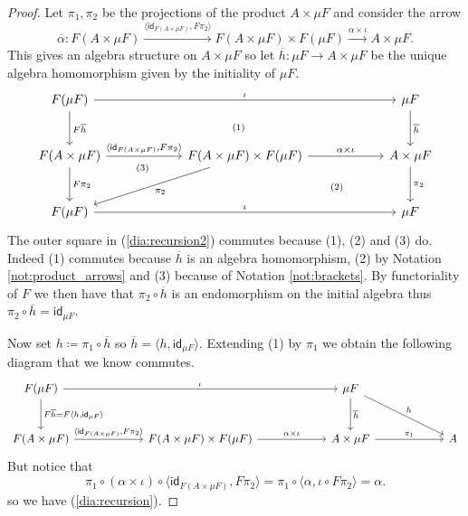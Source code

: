 \documentclass[letterpaper, 11pt, oneside]{memoir}
\theoremstyle{myteo}
\numberwithin{equation}{section}
\newcommand{\id}{\textsf{id}}
\newcommand{\intoprod}[2]{{\langle #1, #2\rangle}}
\begin{document}
\begin{proof}
  Let \(\pi_1, \pi_2\) be the projections of the product \(A \times \mu F\) and consider the arrow
  \begin{equation*}
    \overline{\alpha} \colon F(A \times \mu F) \xrightarrow{\intoprod{\id_{F(A \times \mu F)}}{F\pi_2}} F(A \times \mu F) \times F(\mu F) \xrightarrow{\alpha \times \iota} A \times \mu F.
  \end{equation*}
  This gives an algebra structure on \(A \times \mu F\) so let \(\overline{h} \colon \mu F \to A \times \mu F\) be the unique algebra homomorphism given by the initiality of \(\mu F\).
  \begin{equation}
    \label{dia:recursion2}
    \begin{tikzcd}[row sep = large, column sep = 6 em]
      F(\mu F) \ar[drr, phantom, "\scriptstyle (1)"] \ar[d, "F\overline{h}"] \ar[rr, "\iota"] & & \mu F \ar[d, "\overline{h}"] \\
      F(A \times \mu F) \ar[r, "\intoprod{\id_{F(A \times \mu F)}}{F\pi_2}"] \ar[drr, phantom, "\scriptstyle (3)", very near start] \ar[d, "F\pi_2"] & F(A \times \mu F) \times F(\mu F) \ar[r, "\alpha \times \iota"] \ar[dl, "\pi_2"] \ar[dr, phantom, "\scriptstyle (2)"] & A \times \mu F \ar[d, "\pi_2"] \\
      F(\mu F) \ar[rr, "\iota"] & & \mu F
    \end{tikzcd}
  \end{equation}
  The outer square in (\ref{dia:recursion2}) commutes because (1), (2) and (3) do.
  Indeed (1) commutes because \(\overline{h}\) is an algebra homomorphism, (2) by Notation \ref{not:product_arrows} and (3) because of Notation \ref{not:brackets}.
  By functoriality of \(F\) we then have that \(\pi_2 \circ \overline{h}\) is an endomorphism on the initial algebra thus \(\pi_2 \circ \overline{h} = \id_{\mu F}\).

  Now set \(h \coloneqq \pi_1 \circ \overline{h}\) so \(\overline{h} = \intoprod{h}{\id_{\mu F}}\).
  Extending (1) by \(\pi_1\) we obtain the following diagram that we know commutes.
  \begin{equation*}
    \begin{tikzcd}[row sep = large, column sep = 6 em]
      F(\mu F) \ar[rr, "\iota"] \ar[d, "F\overline{h} = F\intoprod{h}{\id_{\mu F}}"]& & \mu F \ar[d, "\overline{h}"] \ar[dr, "h"] & \\
      F(A \times \mu F) \ar[r, "\intoprod{\id_{F(A \times \mu F)}}{F\pi_2}"] & F(A \times \mu F) \ar[r, "\alpha \times \iota"] \times F(\mu F) & A \times \mu F \ar[r, "\pi_1"] & A
    \end{tikzcd}
  \end{equation*}
  But notice that
  \begin{equation*}
    \pi_1 \circ (\alpha \times \iota) \circ \intoprod{\id_{F(A \times \mu F)}}{F\pi_2} = \pi_1 \circ \intoprod{\alpha}{\iota \circ F\pi_2} = \alpha.
  \end{equation*}
  so we have (\ref{dia:recursion}).


\end{proof}
\end{document}
